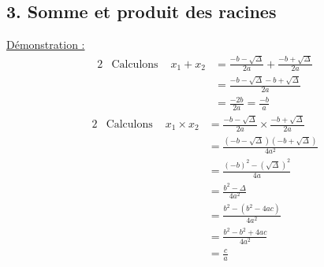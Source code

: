 \documentclass[11pt,a4paper]{article}
\begin{document}
\subsection*{3. Somme et produit des racines}
\underline{Démonstration :}
\begin{alignat*}{2}
     & \text{Calculons } & x_1+x_2 & = \frac{-b-\sqrt{\Delta}}{2a} + \frac{-b+\sqrt{\Delta}}{2a} \\
     &                   &         & = \frac{-b-\sqrt{\Delta}-b+\sqrt{\Delta}}{2a}               \\
     &                   &         & = \frac{-2b}{2a}=\frac{-b}{a}
\end{alignat*}
\begin{alignat*}{2}
     & \text{Calculons } & x_1\times x_2 & = \frac{-b-\sqrt{\Delta}}{2a} \times \frac{-b+\sqrt{\Delta}}{2a} \\
     &                   &               & = \frac{(-b-\sqrt{\Delta})(-b+\sqrt{\Delta})}{4a^2}              \\
     &                   &               & = \frac{(-b)^2-(\sqrt{\Delta})^2}{4a}                            \\
     &                   &               & = \frac{b^2-\Delta}{4a^2}                                        \\
     &                   &               & = \frac{b^2-(b^2-4ac)}{4a^2}                                     \\
     &                   &               & = \frac{b^2-b^2+4ac}{4a^2}                                       \\
     &                   &               & = \frac{c}{a}
\end{alignat*}
\end{document}
